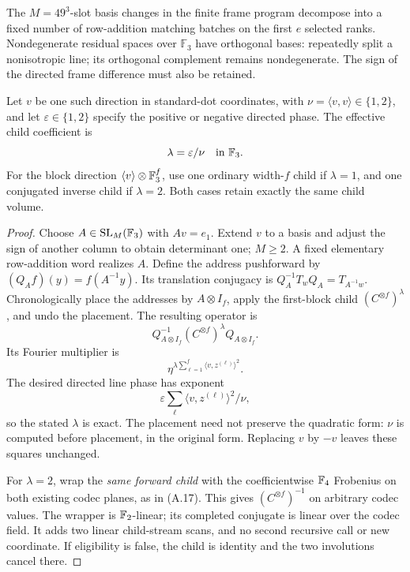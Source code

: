 The $M=49^3$-slot basis changes in the finite frame program decompose
into a fixed number of row-addition matching batches on the first $e$
selected ranks. Nondegenerate residual spaces over $\mathbb F_3$ have
orthogonal bases: repeatedly split a nonisotropic line; its orthogonal
complement remains nondegenerate. The sign of the directed frame
difference must also be retained.

\begin{lemma}
\label{lem:signed-phase-edge}
Let $v$ be one such direction in standard-dot coordinates, with
$\nu=\langle v,v\rangle\in\{1,2\}$, and let
$\varepsilon\in\{1,2\}$ specify the positive or negative directed
phase. The effective child coefficient is
\[
             \lambda=\varepsilon/\nu\quad\hbox{in }\mathbb F_3.
\]
For the block direction $\langle v\rangle\otimes\mathbb F_3^f$, use one
ordinary width-$f$ child if $\lambda=1$, and one conjugated inverse
child if $\lambda=2$. Both cases retain exactly the same child volume.
\end{lemma}
\begin{proof}
Choose $A\in\operatorname{SL}_M(\mathbb F_3)$ with $Av=e_1$.
Extend $v$ to a basis and adjust the sign of another column to obtain
determinant one; $M\ge2$. A fixed elementary row-addition word realizes
$A$. Define the address pushforward by
$(Q_Af)(y)=f(A^{-1}y)$. Its translation conjugacy is
$Q_A^{-1}T_wQ_A=T_{A^{-1}w}$.
Chronologically place the addresses by $A\otimes I_f$, apply the
first-block child $(C^{\otimes f})^\lambda$, and undo the placement.
The resulting operator is
\[
 Q_{A\otimes I_f}^{-1}(C^{\otimes f})^\lambda Q_{A\otimes I_f}.
\]
Its Fourier multiplier is
\[
 \eta^{\lambda\sum_{\ell=1}^f\langle v,z^{(\ell)}\rangle^2}.
\]
The desired directed line phase has exponent
\[
 \varepsilon\sum_\ell\langle v,z^{(\ell)}\rangle^2/\nu,
\]
so the stated $\lambda$ is exact. The placement need not preserve the
quadratic form: $\nu$ is computed before placement, in the original
form. Replacing $v$ by $-v$ leaves these squares unchanged.

For $\lambda=2$, wrap the \emph{same forward child} with the
coefficientwise $\mathbb F_4$ Frobenius on both existing codec planes,
as in (A.17). This gives $(C^{\otimes f})^{-1}$ on arbitrary codec
values. The wrapper is $\mathbb F_2$-linear; its completed conjugate is
linear over the codec field. It adds two linear child-stream scans,
and no second recursive call or new coordinate. If eligibility is
false, the child is identity and the two involutions cancel there.
\end{proof}

